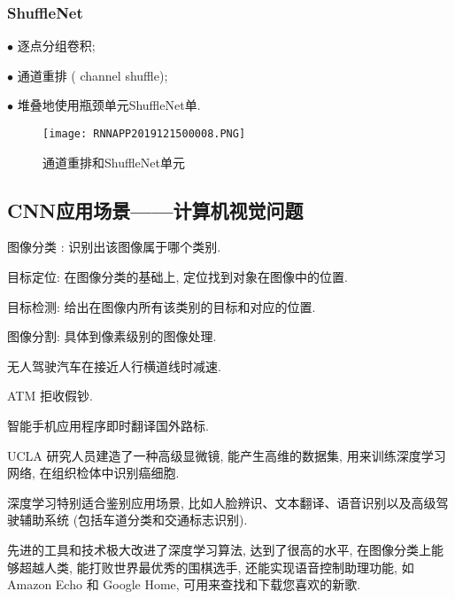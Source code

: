 \subsubsection{ShuffleNet}
\begin{tcolorbox}[title=ShuffleNet]
$\bullet$ 逐点分组卷积;

$\bullet$ 通道重排 ( channel shuffle);

$\bullet$ 堆叠地使用瓶颈单元ShuffleNet单.
\end{tcolorbox}
\begin{figure}[H]
    \centering
    \texttt{[image: RNNAPP2019121500008.PNG]}
    \caption{通道重排和ShuffleNet单元}
    \label{RNNAPP2019121500008}\vspace{-0.4cm}
\end{figure}
\subsection{CNN应用场景——计算机视觉问题}

\qquad{} 图像分类 : 识别出该图像属于哪个类别.

\qquad{} 目标定位: 在图像分类的基础上,  定位找到对象在图像中的位置.

\qquad{} 目标检测: 给出在图像内所有该类别的目标和对应的位置.

\qquad{} 图像分割: 具体到像素级别的图像处理.

\qquad{} 无人驾驶汽车在接近人行横道线时减速.

\qquad{} ATM 拒收假钞.

\qquad{} 智能手机应用程序即时翻译国外路标.

\qquad{} UCLA 研究人员建造了一种高级显微镜, 能产生高维的数据集, 用来训练深度学习网络, 在组织检体中识别癌细胞.

深度学习特别适合鉴别应用场景, 比如人脸辨识、文本翻译、语音识别以及高级驾驶辅助系统 (包括车道分类和交通标志识别).

先进的工具和技术极大改进了深度学习算法, 达到了很高的水平, 在图像分类上能够超越人类, 能打败世界最优秀的围棋选手, 还能实现语音控制助理功能, 如 Amazon Echo 和 Google Home, 可用来查找和下载您喜欢的新歌.

